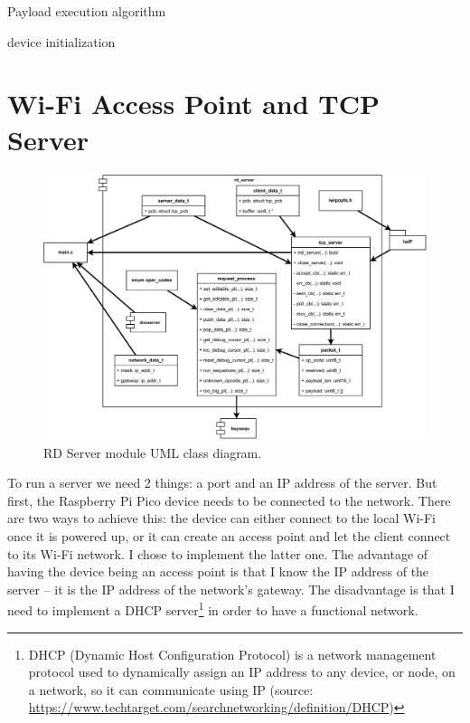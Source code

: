 \begin{algorithm}
\caption{Payload execution algorithm}
\label{alg:payload_exec}
\BlankLine
device initialization\;
\end{algorithm}

\section{Wi-Fi Access Point and TCP Server}
\begin{figure}[ht]
    \centering
    \includegraphics[width=\linewidth]{./obrazky-figures/rd_server_module.pdf}
    \caption{RD Server module UML class diagram.}
    \label{fig:rd_server_module}
\end{figure}
To run a server we need 2 things: a port and an IP address of the server. But first, the Raspberry Pi Pico device needs to be connected to the network. There are two ways to achieve this: the device can either connect to the local Wi-Fi once it is powered up, or it can create an access point and let the client connect to its Wi-Fi network. I chose to implement the latter one. The advantage of having the device being an access point is that I know the IP address of the server \--- it is the IP address of the network's gateway. The disadvantage is that I need to implement a DHCP server\footnote{DHCP (Dynamic Host Configuration Protocol) is a network management protocol used to dynamically assign an IP address to any device, or node, on a network, so it can communicate using IP (source: \url{https://www.techtarget.com/searchnetworking/definition/DHCP})} in order to have a functional network.

